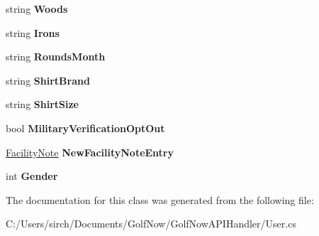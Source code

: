 \begin{DoxyCompactItemize}
string {\bfseries Woods}
\item 
\mbox{\label{class_golf_now_a_p_i_1_1_user_ade43994866dcf58c4dee08d95bdfe609}} 
string {\bfseries Irons}
\item 
\mbox{\label{class_golf_now_a_p_i_1_1_user_a8e77bd412f4b343f2f1ea270d73934b1}} 
string {\bfseries Rounds\+Month}
\item 
\mbox{\label{class_golf_now_a_p_i_1_1_user_a55324e2e8b2bf659a11cc639143ce4e2}} 
string {\bfseries Shirt\+Brand}
\item 
\mbox{\label{class_golf_now_a_p_i_1_1_user_a00cccc0128c91b51507a63bfc3583776}} 
string {\bfseries Shirt\+Size}
\item 
\mbox{\label{class_golf_now_a_p_i_1_1_user_a3d6d179e21b6727bce50eb25862f7373}} 
bool {\bfseries Military\+Verification\+Opt\+Out}
\item 
\mbox{\label{class_golf_now_a_p_i_1_1_user_a80c9a0c8e7f3ee1be48fb1ce2c64ef6a}} 
\mbox{\hyperlink{class_golf_now_a_p_i_1_1_facility_note}{Facility\+Note}} {\bfseries New\+Facility\+Note\+Entry}
\item 
\mbox{\label{class_golf_now_a_p_i_1_1_user_ade6e80dc020604a6b44af25e39f39b72}} 
int {\bfseries Gender}
\end{DoxyCompactItemize}


The documentation for this class was generated from the following file\+:\begin{DoxyCompactItemize}
\item 
C\+:/\+Users/sirch/\+Documents/\+Golf\+Now/\+Golf\+Now\+A\+P\+I\+Handler/User.\+cs\end{DoxyCompactItemize}

